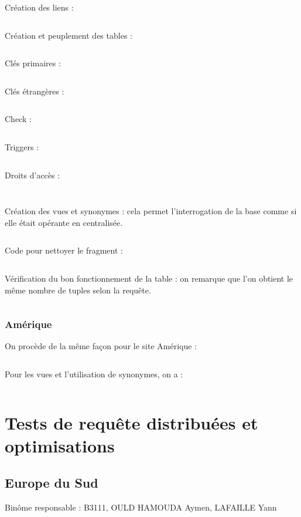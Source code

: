 \documentclass[10pt,a4paper]{article}
\theoremstyle{plain}
\begin{document}
Création des liens :
\inputminted{sql}{EUS_III-C-2-creation_liens.sql}
\newpage

Création et peuplement des tables :
\inputminted{sql}{EUS_III-C-3-creation_tables.sql}
\newpage

Clés primaires : 
\inputminted{sql}{EUS_III-C-5-Primary_key.sql}
\newpage

Clés étrangères :
\inputminted{sql}{EUS_III-C-5_foreign_key.sql}
\newpage

Check :
\inputminted{sql}{EUS_III-C-5_check.sql}
\newpage

Triggers : 
\inputminted{sql}{EUS_III-C-5_trigger.sql}
\newpage

Droits d'accès : 
\inputminted{sql}{EUS_III-C-6.sql}
\inputminted{sql}{EUS_III-C-6_2.sql}
\newpage

Création des vues et synonymes : cela permet l'interrogation de la base comme si elle était opérante en centralisée.

\inputminted{sql}{EUS_III-C-7.sql}
\newpage

Code pour nettoyer le fragment :
\inputminted{sql}{EUS_III-C-8.sql}
\newpage

Vérification du bon fonctionnement de la table : on remarque que l'on obtient le même nombre de tuples selon la requête.
\inputminted{sql}{EUS_III-C-9.sql}
\newpage 

\subsubsection{Amérique}
On procède de la même façon pour le site Amérique :
\inputminted{sql}{AM_SFW.sql}
\newpage 

Pour les vues et l'utilisation de synonymes, on a :
\inputminted{sql}{AM_Vues.sql}
\newpage

\section{Tests de requête distribuées et optimisations}
\subsection{Europe du Sud}
Binôme responsable : B3111, OULD HAMOUDA Aymen, LAFAILLE Yann
\end{document}
